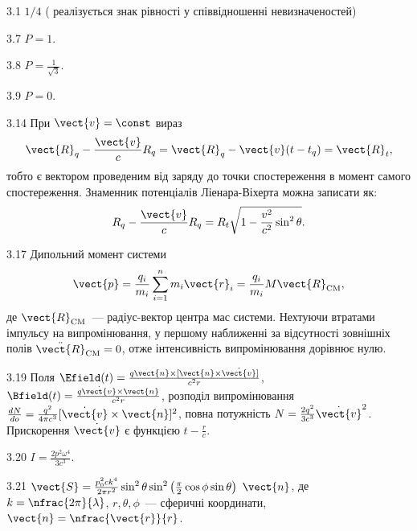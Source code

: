 \protect \section *{}
\begin{Solution}{3.{1}}
	$1/4$ ( реалізується знак рівності у співвідношенні невизначеностей)
\end{Solution}
\begin{Solution}{3.{7}}
$P = 1$.
\end{Solution}
\begin{Solution}{3.{8}}
$P = \frac1{\sqrt{3}}$.
\end{Solution}
\begin{Solution}{3.{9}}
$P = 0$.
\end{Solution}
\begin{Solution}{3.{14}}
	При $\vect{v} = \const$  вираз
	\[
		\vect{R}_q - \frac{\vect{v}}{c} R_q = \vect{R}_q -\vect{v}(t - t_q) = \vect{R}_t,
	\]
	тобто є вектором проведеним від заряду до точки спостереження в момент самого спостереження.
	Знаменник потенціалів Ліенара-Віхерта можна записати як:
	\[
		R_q - \frac{\vect{v}}{c} R_q = R_t\sqrt{1-\frac{v^2}{c^2}\sin^2\theta}.
	\]
\end{Solution}
\begin{Solution}{3.{17}}
	Дипольний момент системи
	\[
		\vect{p} = \frac{q_i}{m_i} \sum\limits_{i = 1}^n m_i \vect{r}_i = \frac{q_i}{m_i} M\vect{R}_\mathrm{CM},
	\]
	де $\vect{R}_\mathrm{CM}$~--- радіус-вектор центра мас системи. Нехтуючи втратами імпульсу на випромінювання, у першому наближенні за відсутності зовнішніх полів $\ddot{\vect{R}}_\mathrm{CM} = 0$, отже інтенсивність випромінювання дорівнює нулю.
\end{Solution}
\begin{Solution}{3.{19}}
%
	Поля $\Efield(t) = \frac{q\vect{n}\times[ \vect{n} \times \dot{\vect{v}}] }{c^2r}$,
	$\Bfield(t) = \frac{q\dot{\vect{v}}\times\vect{n}}{c^2r}$,
	розподіл випромінювання $\frac{dN}{do} = \frac{q^2}{4\pi c^3}[\dot{\vect{v}}\times\vect{n}]^2$, повна потужність $N = \frac{2q^2}{3c^3}\dot{\vect{v}}^2$. Прискорення $ \dot{\vect{v}} $ є функцією $t - \frac{r}{c}$.
\end{Solution}
\begin{Solution}{3.{20}}
	$I = \frac{2p^2\omega^4}{3c^3}$.
\end{Solution}
\begin{Solution}{3.{21}}
	$\vect{S} = \frac{p_0^2ck^4}{2\pi r^2}\sin^2\theta\sin^2\left(\frac\pi2\cos\phi\sin\theta\right)\ \vect{n}$, де $k=\nfrac{2\pi}{\lambda}$, $r,\theta,\phi$~--- сферичні координати, $\vect{n} = \nfrac{\vect{r}}{r}$.
\end{Solution}
